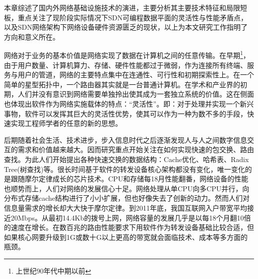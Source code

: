 
\label{sec:pdpintro}

\label{chap21}
本章综述了国内外网络基础设施技术的演进，主要分析其主要技术特征和局限短板，重点关注了现阶段实际情况下SDN可编程数据平面的灵活性与性能矛盾点，以及SDN网络架构下网络设备硬件资源匮乏的现状，以上为本文研究工作指明了方向和意义所在。







\label{chap22}





 \label{chap221}

网络对于业务的基本价值是网络实现了数据在计算机之间的任意传输。在早期\footnote{上世纪90年代中期以前}，由于用户数量、计算机算力、存储、硬件性能都过于微弱，作为连接所有终端、服务与用户的管道，网络的主要特点集中在连通性、可行性和初期探索性上。在一个简单的星型拓扑中，一个路由器其实就是一台普通计算机。在学术和产业界的初期，人们并没有意识到网络需要单独拎出使其成为一套独立系统的价值。这在侧面也体现出软件作为网络实施载体的特点：“灵活性”。即：对于处理并实现一个新兴事物，软件可以发挥其巨大的灵活性优势，使其可以作为一种为数不多的手段，快速实现工程师学者的任意的新的思想。

后期随着社会生活、技术进步，步入信息时代之后逐渐发现人与人之间数字信息交互的需求和价值越来越大。因而研究重点开始关注在如何实现快速的包交换、路由查找。为此人们开始提出各种快速交换的数据结构：Cache优化、哈希表、Radix Tree(树查找)等。很长时间基于软件的转发设备核心架构都没有变化，唯一变化的是跟随摩尔定律成长的芯片技术。CPU和存储每18月性能翻番，网络设备的性能也顺势而上，人们对网络的发展信心十足。网络处理从单CPU向多CPU并行，向分布式存储cache结构进行了小小扩展，但也好像失去了创新的动力。然而人们对信息量需求的增长却大大快于摩尔定律。到2011年底，我国互联网入户带宽平均接近20Mbps。从最初14.4Kb的拨号上网，网络容量的发展几乎是以每18个月翻10倍的速度在增长。在数百兆的路由性能要求下用软件作为转发设备基础比较合适，但如果核心网要升级到1G或数十G以上更高的带宽就会面临技术、成本等多方面的瓶颈。

\label{chap222}

